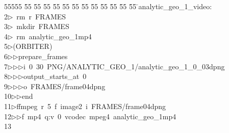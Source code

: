%
%
\begin{tabbing}
55555 \= 55 \= 55 \= 55 \= 55 \= 55 \= 55 \= 55 \= 55 \= 55 \= 55 \= 55 \= 55 \= \>analytic\_geo\_1\_video:\\[0pt]
2\>$\triangleright$\>\ rm\ r\ FRAMES\\[0pt]
3\>$\triangleright$\>\ mkdir\ FRAMES\\[0pt]
4\>$\triangleright$\>\ rm\ analytic\_geo\_1mp4\\[0pt]
5\>$\triangleright$\>(ORBITER)\ \\[0pt]
6\>$\triangleright$\>$\triangleright$\>prepare\_frames\ \\[0pt]
7\>$\triangleright$\>$\triangleright$\>$\triangleright$\>i\ 0\ 30\ PNG/ANALYTIC\_GEO\_1/analytic\_geo\_1\_0\_03dpng\ \\[0pt]
8\>$\triangleright$\>$\triangleright$\>$\triangleright$\>output\_starts\_at\ 0\ \\[0pt]
9\>$\triangleright$\>$\triangleright$\>$\triangleright$\>o\ FRAMES/frame04dpng\ \\[0pt]
10\>$\triangleright$\>$\triangleright$\>end\\[0pt]
11\>$\triangleright$\>ffmpeg\ r\ 5\ f\ image2\ i\ FRAMES/frame04dpng\ \\[0pt]
12\>$\triangleright$\>$\triangleright$\>f\ mp4\ q:v\ 0\ vcodec\ mpeg4\ analytic\_geo\_1mp4\\[0pt]
13\>\end{tabbing}

